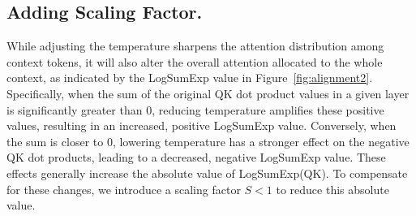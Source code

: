 \subsection{Adding Scaling Factor.}



While adjusting the temperature sharpens the attention distribution among context tokens, it will also alter the overall attention allocated to the whole context, as indicated by the LogSumExp value in Figure~\ref{fig:alignment2}. Specifically, when the sum of the original QK dot product values in a given layer is significantly greater than 0, reducing temperature amplifies these positive values, resulting in an increased, positive LogSumExp value. Conversely, when the sum is closer to 0, lowering temperature has a stronger effect on the negative QK dot products, leading to a decreased, negative LogSumExp value. These effects generally increase the absolute value of LogSumExp(QK). To compensate for these changes, we introduce a scaling factor $S < 1$ to reduce this absolute value.








